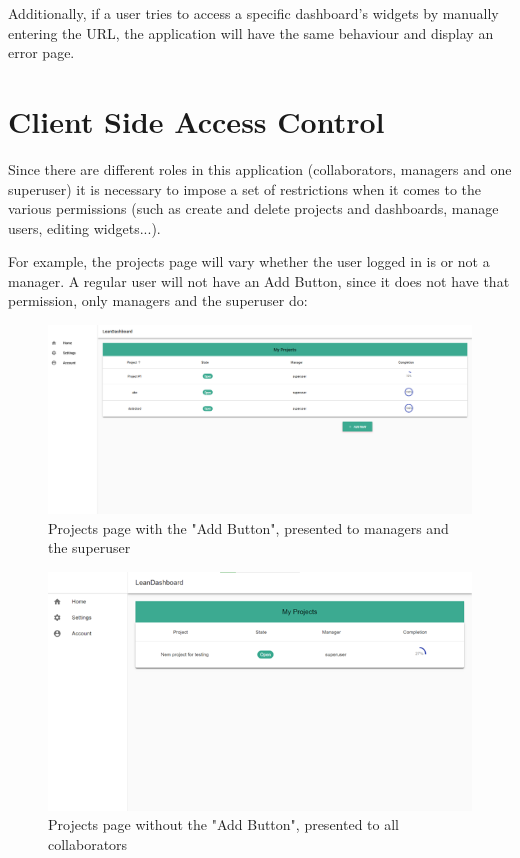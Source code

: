 \documentclass[a4paper,twoside,10pt]{report}
\begin{document}
Additionally, if a user tries to access a specific dashboard’s widgets by manually entering the URL, the application will have the same behaviour and display an error page.

\section{Client Side Access Control}
Since there are different roles in this application (collaborators, managers and one superuser) it is necessary to impose a set of restrictions when it comes to the various permissions (such as create and delete projects and dashboards, manage users, editing widgets...).

For example, the projects page will vary whether the user logged in is or not a manager. A regular user will not have an Add Button, since it does not have that permission, only managers and the superuser do:
\begin{figure}[h!]
\center
    \includegraphics[width=\textwidth]{projectsPage.png}
\caption{Projects page with the "Add Button", presented to managers and the superuser }
\end{figure}

\begin{figure}[h!]
\center
    \includegraphics[width=\textwidth]{projectsPageNoAddButton.png}
\caption{Projects page without the "Add Button", presented to all collaborators}
\end{figure}
\end{document}
